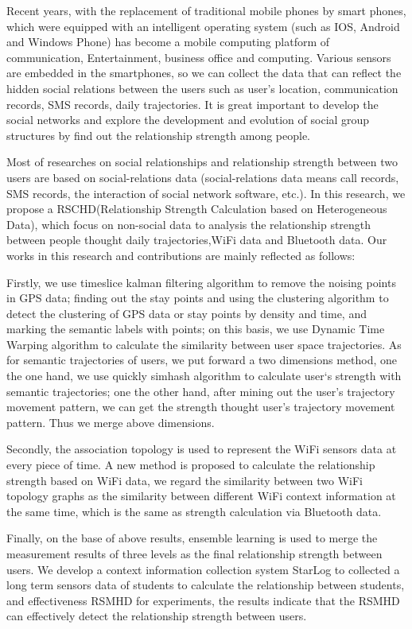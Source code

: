\begin{eabstract}
Recent years, with the replacement of traditional mobile phones by smart phones, which were equipped with an intelligent operating system (such as IOS, Android and Windows Phone) has become a mobile computing platform of communication, Entertainment, business office and computing. Various sensors are embedded in the smartphones, so we can collect the data that can reflect the hidden social relations between the users such as user's location, communication records, SMS records, daily trajectories. It is great important to develop the social networks and explore the development and evolution of social group structures by find out the relationship strength among people.
\par Most of researches on social relationships and relationship strength between two users are based on social-relations data (social-relations data means call records, SMS records, the interaction of social network software, etc.). In this research, we propose a RSCHD(Relationship Strength Calculation based on  Heterogeneous Data), which focus on non-social data to analysis the relationship strength between people thought daily trajectories,WiFi data and Bluetooth data. Our works in this research and contributions are mainly reflected as follows:

\par Firstly, we use timeslice kalman filtering algorithm to remove the noising points in GPS data; finding out the stay points and using the clustering algorithm to detect the clustering of GPS data or stay points by density and time, and marking the semantic labels with points; on this basis, we use Dynamic Time Warping algorithm to calculate the similarity between user space trajectories. As for semantic trajectories of users, we put forward a two dimensions method, one the one hand, we use quickly simhash algorithm to calculate user`s strength with semantic trajectories; one the other hand, after mining out the user's trajectory movement pattern, we can get the strength thought user's trajectory movement pattern. Thus we merge above dimensions.
\par Secondly, the association topology is used to represent the WiFi sensors data at every piece of time. A new method is proposed to calculate the relationship strength based on WiFi data, we regard the similarity between two WiFi topology graphs as the similarity between different WiFi context information at the same time, which is the same as strength calculation via Bluetooth data.
\par Finally, on the base of above results, ensemble learning is used to merge the measurement results of three levels as the final relationship strength between users. We develop a context information collection system StarLog to collected a long term sensors data of students to calculate the relationship between students, and effectiveness RSMHD for experiments, the results indicate that the RSMHD can effectively detect the relationship strength between users.
\end{eabstract}

